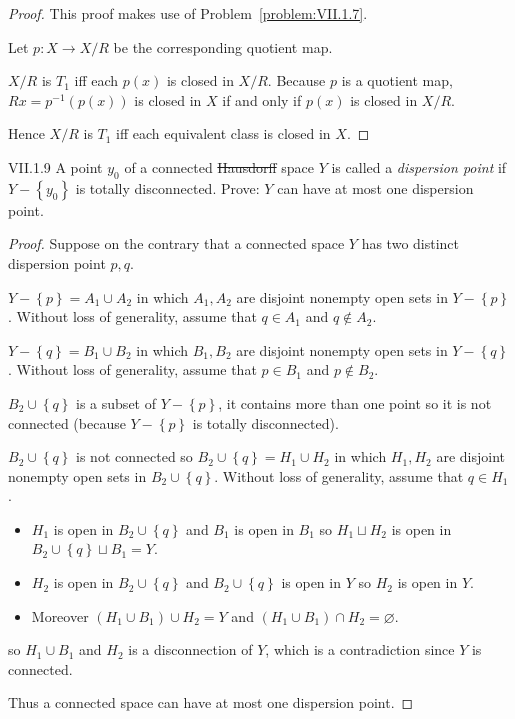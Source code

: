 \begin{proof}
	This proof makes use of Problem~\ref{problem:VII.1.7}.

	Let \( p: X \to X/R \) be the corresponding quotient map.

	\( X/R \) is \( T_{1} \) iff each \( p(x) \) is closed in \( X/R \). Because \( p \) is a quotient map, \( Rx = p^{-1}(p(x)) \) is closed in \( X \) if and only if \( p(x) \) is closed in \( X/R \).

	Hence \( X/R \) is \( T_{1} \) iff each equivalent class is closed in \( X \).
\end{proof}

\begin{problem}{VII.1.9}
A point \( y_{0} \) of a connected \st{Hausdorff} space \( Y \) is called a \textit{dispersion point} if \( Y - \left\{ y_{0} \right\} \) is totally disconnected. Prove: \( Y \) can have at most one dispersion point.
\end{problem}

\begin{proof}
	Suppose on the contrary that a connected space \( Y \) has two distinct dispersion point \( p, q \).

	\( Y - \left\{ p \right\} = A_{1} \cup A_{2} \) in which \( A_{1}, A_{2} \) are disjoint nonempty open sets in \( Y - \left\{ p \right\} \). Without loss of generality, assume that \( q \in A_{1} \) and \( q \notin A_{2} \).

	\( Y - \left\{ q \right\} = B_{1} \cup B_{2} \) in which \( B_{1}, B_{2} \) are disjoint nonempty open sets in \( Y - \left\{ q \right\} \). Without loss of generality, assume that \( p \in B_{1} \) and \( p \notin B_{2} \).

	\( B_{2} \cup \left\{ q \right\} \) is a subset of \( Y - \left\{ p \right\} \), it contains more than one point so it is not connected (because \( Y - \left\{ p \right\} \) is totally disconnected).

	\( B_{2} \cup \left\{ q \right\} \) is not connected so \( B_{2} \cup \left\{ q \right\} = H_{1} \cup H_{2} \) in which \( H_{1}, H_{2} \) are disjoint nonempty open sets in \( B_{2} \cup \left\{ q \right\} \). Without loss of generality, assume that \( q \in H_{1} \).
	\begin{itemize}
		\item \( H_{1} \) is open in \( B_{2} \cup \left\{ q \right\} \) and \( B_{1} \) is open in \( B_{1} \) so \( H_{1} \sqcup H_{2} \) is open in \( B_{2} \cup \left\{ q \right\} \sqcup B_{1} = Y \).
		\item \( H_{2} \) is open in \( B_{2} \cup \left\{ q \right\} \) and \( B_{2} \cup \left\{ q \right\} \) is open in \( Y \) so \( H_{2} \) is open in \( Y \).
		\item Moreover \( (H_{1} \cup B_{1}) \cup H_{2} = Y \) and \( (H_{1} \cup B_{1}) \cap H_{2} = \varnothing \).
	\end{itemize}

	so \( H_{1} \cup B_{1} \) and \( H_{2} \) is a disconnection of \( Y \), which is a contradiction since \( Y \) is connected.

	Thus a connected space can have at most one dispersion point.
\end{proof}

